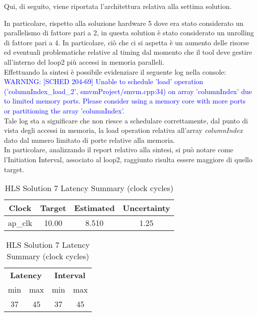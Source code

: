 Qui, di seguito, viene riportata l'architettura relativa alla settima solution.



In particolare, rispetto alla soluzione hardware 5 dove era stato considerato un parallelismo di fattore pari a 2, in questa solution è stato considerato un unrolling di fattore pari a 4. In particolare, ciò che ci si aspetta è un aumento delle risorse ed eventuali problematiche relative al timing dal momento che il tool deve gestire all'interno del loop2 più accessi in memoria paralleli.
\\
Effettuando la sintesi è possibile evidenziare il seguente log nella console:
\\
\textcolor{blue}{WARNING: [SCHED 204-69] Unable to schedule 'load' operation ('columnIndex\_load\_2', smvmProject/smvm.cpp:34) on array 'columnIndex' due to limited memory ports. Please consider using a memory core with more ports or partitioning the array 'columnIndex'.}
\\
Tale log sta a significare che non riesce a schedulare correttamente, dal punto di vista degli accessi in memoria, la load operation relativa all'array \textit{columnIndex} dato dal numero limitato di porte relative alla memoria.
\\
In particolare, analizzando il report relativo alla sintesi, si può notare come l'Initiation Interval, associato al loop2, raggiunto risulta essere maggiore di quello target.
\\

\begin{table}[H]
	\centering
	\begin{minipage}[t]{0.45\linewidth}
		\centering
		\begin{tabular}{|c|c|c|c|}
			\hline
			\textbf{Clock} & \textbf{Target} & \textbf{Estimated} & \textbf{Uncertainty} \\
			\hline
			ap\_clk & 10.00 & 8.510 & 1.25 \\
			\hline
		\end{tabular}
		\caption{HLS Solution 7 Timing Summary (ns)}
		\label{tab:hls-solution-7-timing-summary}
	\end{minipage}
	\hfill
	\begin{minipage}[t]{0.45\linewidth}
		\centering
		\begin{tabular}{|c|c|c|c|}
			\hline
			\multicolumn{2}{|c|}{\textbf{Latency}} & \multicolumn{2}{|c|}{\textbf{Interval}} \\
			min & max & min & max \\
			\hline
			37 & 45 & 37 & 45 \\
			\hline
		\end{tabular}
		\caption{HLS Solution 7 Latency Summary (clock cycles)}
		\label{tab:hls-solution-7-latency-summary}
	\end{minipage}
\end{table}

